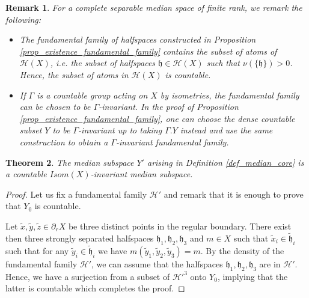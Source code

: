 \documentclass{amsart}
\numberwithin{equation}{section}
\newtheorem{thm}{Theorem}[section]
\newtheorem{rmk}[thm]{Remark}
\newcommand{\HH}{\mathcal{H}}     %
\newcommand{\hh}{\mathfrak{h}}    %
\theoremstyle{definition}
\begin{document}
\begin{rmk}\label{rmk_fundamental_family}
For a complete separable median space of finite rank, we remark the following:
\begin{itemize}
    \item  The fundamental family of halfspaces constructed in Proposition \ref{prop_existence_fundamental_family} contains the subset of atoms of $\HH(X)$, i.e. the subset of halfspaces $\hh\in\HH(X)$ such that $\nu(\{\hh\})>0$. Hence, the subset of atoms in $\HH(X)$ is countable.

    \item If $\Gamma$ is a countable group acting on $X$ by isometries, the fundamental family can be chosen to be $\Gamma$-invariant. In the proof of Proposition \ref{prop_existence_fundamental_family}, one can choose the dense countable subset $Y$ to be $\Gamma$-invariant up to taking $\Gamma.Y$ instead and use the same construction to obtain a $\Gamma$-invariant fundamental family.
\end{itemize}
    
\end{rmk}




\begin{thm}\label{thm_countable_medians_subspace}
    The median subspace $Y'$ arising in Definition \ref{def_median_core} is a countable $Isom(X)$-invariant median subspace.
\end{thm}
\begin{proof}
  Let us fix a fundamental family $\HH'$ and remark that it is enough to prove that $Y_0$ is countable.\par 
Let $\tilde{x},\tilde{y},\tilde{z}\in\partial_r X$ be three distinct points in the regular boundary. There exist then three strongly separated halfspaces $\hh_1,\hh_2,\hh_3$ and $m\in X$ such that $\tilde{x}_i\in\tilde{\hh}_i$ such that for any $\tilde{y}_i\in\tilde{\hh}_i$ we have $m(\tilde{y}_1,\tilde{y}_2,\tilde{y}_3)=m$. By the density of the fundamental family $\HH'$, we can assume that the halfspaces $\hh_1,\hh_2,\hh_3$ are in $\HH'$. Hence, we have a surjection from a subset of $\HH'^3$ onto $Y_0$, implying that the latter is countable which completes the proof. 
\end{proof}


    
\end{document}
